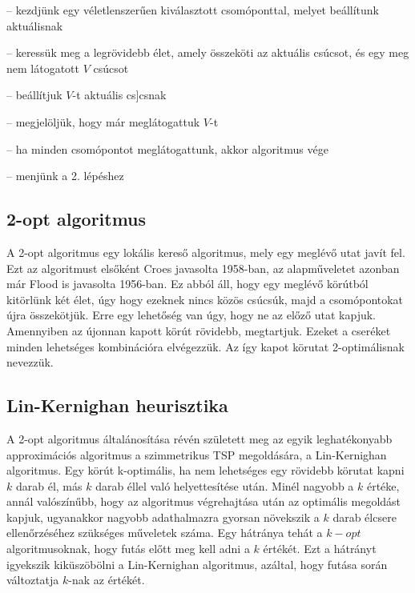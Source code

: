 \begin{description}
	\setlength{\itemsep}{0.04mm}
	\item[1. lépés] -- kezdjünk egy véletlenszerűen kiválasztott csomóponttal, melyet beállítunk aktuálisnak
	\item[2. lépés] -- keressük meg a legrövidebb élet, amely összeköti az aktuális csúcsot, és egy meg nem látogatott \(V\) csúcsot
	\item[3. lépés] -- beállítjuk \(V\)-t aktuális cs]csnak
	\item[4. lépés] -- megjelöljük, hogy már meglátogattuk \(V\)-t
	\item[5. lépés] -- ha minden csomópontot meglátogattunk, akkor algoritmus vége
	\item[6. lépés] -- menjünk a 2. lépéshez
\end{description}

\subsection{2-opt algoritmus}

A 2-opt algoritmus egy lokális kereső algoritmus, mely egy meglévő utat javít fel. Ezt az algoritmust elsőként Croes javasolta 1958-ban, az alapműveletet azonban már Flood is javasolta 1956-ban. Ez abból áll, hogy egy meglévő körútból kitörlünk két élet, úgy hogy ezeknek nincs közös csúcsúk, majd a csomópontokat újra összekötjük. Erre egy lehetőség van úgy, hogy ne az előző utat kapjuk. Amennyiben az újonnan kapott körút rövidebb, megtartjuk. Ezeket a cseréket minden lehetséges kombinációra elvégezzük. Az így kapot körutat 2-optimálisnak nevezzük.

\subsection{Lin-Kernighan heurisztika}

A 2-opt algoritmus általánosítása révén született meg az egyik leghatékonyabb approximációs algoritmus a szimmetrikus TSP megoldására, a Lin-Kernighan algoritmus\cite{lin_kern}. Egy körút k-optimális, ha nem lehetséges egy rövidebb körutat kapni \(k\) darab él, más \(k\) darab éllel való helyettesítése után. Minél nagyobb a \(k\) értéke, annál valószínűbb, hogy az algoritmus végrehajtása után az optimális megoldást kapjuk, ugyanakkor nagyobb adathalmazra gyorsan növekszik a \(k\) darab élcsere ellenőrzéséhez szükséges műveletek száma. Egy hátránya tehát a \(k-opt\) algoritmusoknak, hogy futás előtt meg kell adni a \(k\) értékét. Ezt a hátrányt igyekszik kiküszöbölni a Lin-Kernighan algoritmus, azáltal, hogy futása során változtatja \(k\)-nak az értékét.

